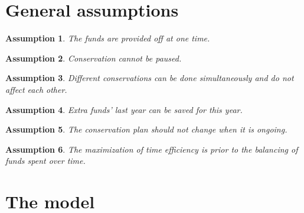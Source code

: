 \documentclass{article}
\newtheorem{assumption}{Assumption}
\begin{document}
\section{General assumptions}

\begin{assumption}
\label{as:funds at one time}
The funds are provided off at one time.
\end{assumption}

\begin{assumption}
	Conservation cannot be paused.
\end{assumption}
\begin{assumption}
	Different conservations can be done simultaneously and do not affect each other.
\end{assumption}
\begin{assumption}
	Extra funds' last year can be saved for this year.
\end{assumption}
\begin{assumption}
	The conservation plan should not change when it is ongoing.	
\end{assumption}
\begin{assumption}
\label{as:time efficiency over balancing}
The maximization of time efficiency is prior to the balancing of funds spent over time.
\end{assumption}


\section{The model}
\label{sec:model}
\end{document}
